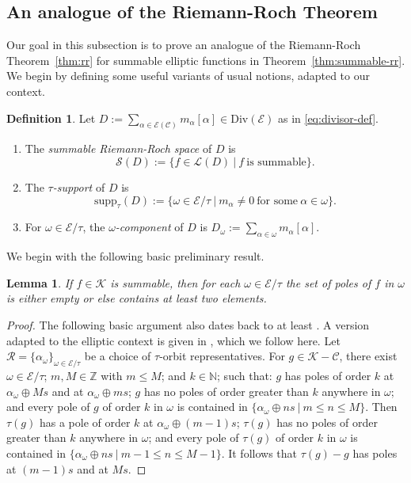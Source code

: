 \documentclass[preprint,12pt]{elsarticle}
\numberwithin{equation}{section} %
\theoremstyle{theorem}
\newtheorem{lemma}[theorem]{Lemma}
\theoremstyle{definition}
\newtheorem{definition}[theorem]{Definition}
\newcommand{\Ca}{\mathcal{C}} %
\newcommand{\bk}{\mathcal{K}} %
\newcommand{\ec}{\mathcal{E}} %
\newcommand{\orbita}{{\ec/\tau}} %
\newcommand{\Z}{\mathbb{Z}} %
\begin{document}
\subsection{An analogue of the Riemann-Roch Theorem} \label{sec:summable-rr}

Our goal in this subsection is to prove an analogue of the Riemann-Roch Theorem~\ref{thm:rr} for summable elliptic functions in Theorem~\ref{thm:summable-rr}. We begin by defining some useful variants of usual notions, adapted to our context.

\begin{definition}\label{def:tau-divisors} Let $ D:=\displaystyle\sum_{\alpha\in\ec(\Ca)}m_\alpha[\alpha]\in\mathrm{Div}(\ec)$ as in \eqref{eq:divisor-def}.
\begin{enumerate}
    \item The \emph{summable Riemann-Roch space} of $D$ is \[\mathcal{S}(D):=\bigl\{f\in\mathcal{L}(D) \ \big| \ f \ \text{is summable}\bigr\}.\]
    \item The $\tau$\emph{-support} of $D$ is \[\mathrm{supp}_\tau(D):=\{\omega\in\orbita \ | \ m_\alpha\neq 0\ \text{for some} \ \alpha\in\omega\}.\]
    \item For $\omega\in\orbita$, the $\omega$\emph{-component} of $D$ is $D_\omega:=\sum_{\alpha\in\omega}m_\alpha[\alpha]$.
\end{enumerate} 
\end{definition}

We begin with the following basic preliminary result.

\begin{lemma}\label{lem:summable-dispersion} If $f\in\bk$ is summable, then for each $\omega\in\orbita$ the set of poles of $f$ in $\omega$ is either empty or else contains at least two elements.   
\end{lemma}

\begin{proof} The following basic argument also dates back to at least \cite{Abramov:1971}. A version adapted to the elliptic context is given in \cite[p.~196]{Dreyfus2018}, which we follow here. Let $\mathcal{R}=\{\alpha_\omega\}_{\omega\in\orbita}$ be a choice of $\tau$-orbit representatives. For $g\in\bk-\Ca$, there exist $\omega\in\orbita$; $m,M\in\Z$ with $m\leq M$; and $k\in\mathbb{N}$; such that: $g$ has poles of order $k$ at $\alpha_\omega\oplus Ms$ and at $\alpha_\omega\oplus ms$; $g$ has no poles of order greater than $k$ anywhere in $\omega$; and every pole of $g$ of order $k$ in $\omega$ is contained in $\{\alpha_\omega\oplus ns \ | \ m\leq n \leq M\}$. Then $\tau(g)$ has a pole of order $k$ at $\alpha_\omega\oplus (m-1)s$; $\tau(g)$ has no poles of order greater than $k$ anywhere in $\omega$; and every pole of $\tau(g)$ of order $k$ in $\omega$ is contained in $\{\alpha_\omega\oplus ns \ | \ m-1\leq n \leq M-1\}$. It follows that $\tau(g)-g$ has poles at $(m-1)s$ and at $Ms$.
\end{proof}
\end{document}
